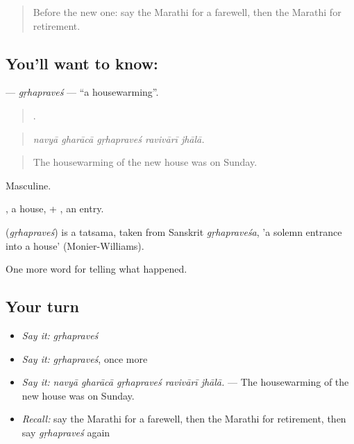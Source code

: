 \label{lesson:MR-C323-grhapraves}



\begin{quote}
Before the new one: say the Marathi for a farewell, then the Marathi for retirement.
\end{quote}

\subsection*{You'll want to know: }
\textbf{} — \emph{gṛhapraveś} — \textquotedblleft{}a housewarming\textquotedblright{}.

\begin{quote}
    .
\end{quote}

\begin{quote}
\emph{navyā gharācā gṛhapraveś ravivārī jhālā.}
\end{quote}

\begin{quote}
The housewarming of the new house was on Sunday.
\end{quote}

Masculine.

, a house, + , an entry.

\begin{cousinweb}
\textbf{} (\emph{gṛhapraveś}) is a tatsama, taken from Sanskrit \emph{gṛhapraveśa}, 'a solemn entrance into a house' (Monier-Williams).
\end{cousinweb}

\begin{grammarlens}[title={What you've built}]
One more word for telling what happened.
\end{grammarlens}

\subsection*{Your turn}
\begin{itemize}
\raggedright
  \item \emph{Say it:} \emph{gṛhapraveś}
  \item \emph{Say it:} \emph{gṛhapraveś}, once more
  \item \emph{Say it:} \emph{navyā gharācā gṛhapraveś ravivārī jhālā.} — The housewarming of the new house was on Sunday.
  \item \emph{Recall:} say the Marathi for a farewell, then the Marathi for retirement, then say \emph{gṛhapraveś} again
\end{itemize}

